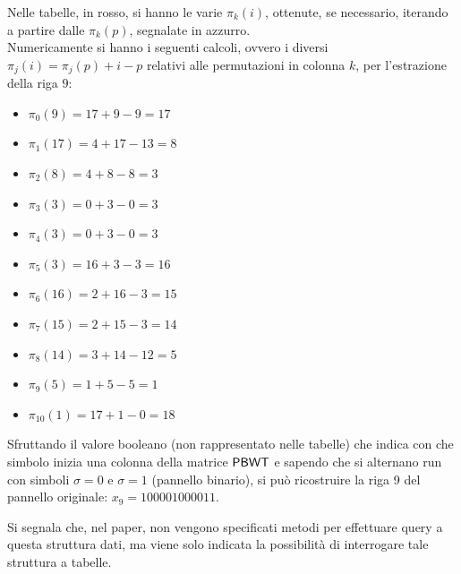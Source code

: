 \begin{esempio}
\begin{figure}[H]
  \end{figure}
  Nelle tabelle, in rosso, si hanno le varie $\pi_k(i)$,
  ottenute, 
  se necessario, iterando a partire dalle $\pi_k(p)$, segnalate in azzurro. \\
  Numericamente si hanno i seguenti calcoli, ovvero i diversi
  $\pi_j(i)=\pi_j(p)+i-p$
  relativi alle permutazioni in colonna $k$, per l'estrazione della riga $9$:
  \begin{multicols}{2}
    \begin{itemize}
      \item $\pi_{0}(9)=17+9-9=17$
      \item $\pi_{1}(17)=4+17-13=8$
      \item $\pi_{2}(8)=4+8-8=3$
      \item $\pi_{3}(3)=0+3-0=3$
      \item $\pi_{4}(3)=0+3-0=3$
      \item $\pi_{5}(3)=16+3-3=16$
      \item $\pi_{6}(16)=2+16-3=15$
      \item $\pi_{7}(15)=2+15-3=14$
      \item $\pi_{8}(14)=3+14-12=5$
      \item $\pi_{9}(5)=1+5-5=1$
      \item $\pi_{10}(1)=17+1-0=18$
    \end{itemize}
  \end{multicols}
  Sfruttando il valore booleano (non rappresentato nelle tabelle) che indica con
  che simbolo inizia una colonna 
  della matrice $\mbox{\rm {\sf PBWT}}$ e
  sapendo che si alternano run con simboli $\sigma=0$ e
  $\sigma=1$ (pannello binario), si può ricostruire la riga 9 del pannello
  originale: 
  $x_9=100001000011$.
\end{esempio}
Si segnala che, nel paper, non vengono specificati metodi per
effettuare query a 
questa struttura dati, ma viene solo indicata la possibilità di interrogare
tale struttura a tabelle.
